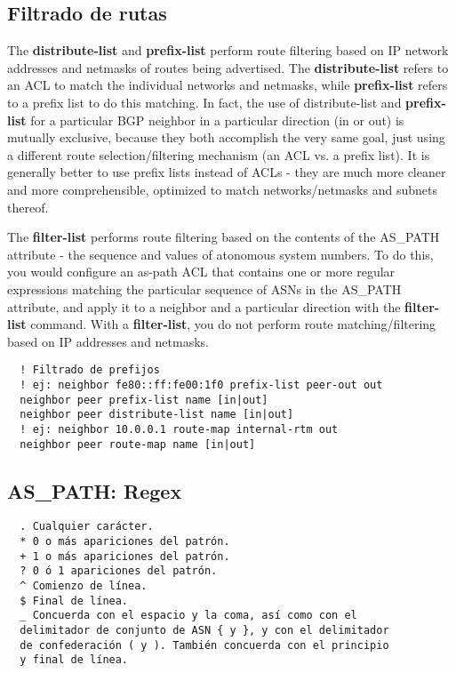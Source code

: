 \documentclass{article}
\begin{document}
\newpage

\subsection{Filtrado de rutas}
  The \textbf{distribute-list} and \textbf{prefix-list} perform route filtering
  based on IP network addresses and netmasks of routes being advertised. The
  \textbf{distribute-list} refers to an ACL to match the individual networks and
  netmasks, while \textbf{prefix-list} refers to a prefix list to do this matching.
  In fact, the use of distribute-list and \textbf{prefix-list} for a particular
  BGP neighbor in a particular direction (in or out) is mutually exclusive,
  because they both accomplish the very same goal, just using a different
  route selection/filtering mechanism (an ACL vs. a prefix list).
  It is generally better to use prefix lists instead of ACLs - they are much
  more cleaner and more comprehensible, optimized to match networks/netmasks
  and subnets thereof.

  The \textbf{filter-list} performs route filtering based on the contents of the
  AS\_PATH attribute - the sequence and values of atonomous system numbers.
  To do this, you would configure an as-path ACL that contains one or more
  regular expressions matching the particular sequence of ASNs in the AS\_PATH
  attribute, and apply it to a neighbor and a particular direction with the
  \textbf{filter-list} command. With a \textbf{filter-list}, you do not perform
  route matching/filtering based on IP addresses and netmasks.

\begin{verbatim}
  ! Filtrado de prefijos
  ! ej: neighbor fe80::ff:fe00:1f0 prefix-list peer-out out
  neighbor peer prefix-list name [in|out]
  neighbor peer distribute-list name [in|out]
  ! ej: neighbor 10.0.0.1 route-map internal-rtm out
  neighbor peer route-map name [in|out]
\end{verbatim}

\subsection{AS\_PATH: Regex}
\begin{verbatim}
  . Cualquier carácter.
  * 0 o más apariciones del patrón.
  + 1 o más apariciones del patrón.
  ? 0 ó 1 apariciones del patrón.
  ^ Comienzo de línea.
  $ Final de línea.
  _ Concuerda con el espacio y la coma, así como con el
  delimitador de conjunto de ASN { y }, y con el delimitador
  de confederación ( y ). También concuerda con el principio
  y final de línea.
\end{verbatim}
\end{document}
